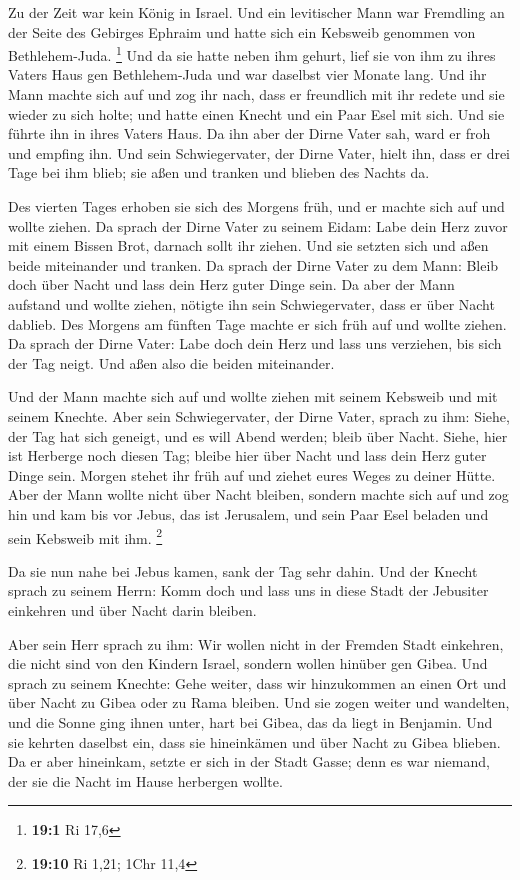  Zu der Zeit war kein König in Israel. Und ein levitischer
Mann war Fremdling an der Seite des Gebirges Ephraim und hatte sich ein
Kebsweib genommen von Bethlehem-Juda. \footnote{\textbf{19:1} Ri 17,6}
 Und da sie hatte neben ihm gehurt, lief sie von ihm zu
ihres Vaters Haus gen Bethlehem-Juda und war daselbst vier Monate lang.
 Und ihr Mann machte sich auf und zog ihr nach, dass er
freundlich mit ihr redete und sie wieder zu sich holte; und hatte einen
Knecht und ein Paar Esel mit sich. Und sie führte ihn in ihres Vaters
Haus. Da ihn aber der Dirne Vater sah, ward er froh und empfing ihn.
 Und sein Schwiegervater, der Dirne Vater, hielt ihn, dass
er drei Tage bei ihm blieb; sie aßen und tranken und blieben des Nachts
da.

 Des vierten Tages erhoben sie sich des Morgens früh, und
er machte sich auf und wollte ziehen. Da sprach der Dirne Vater zu
seinem Eidam: Labe dein Herz zuvor mit einem Bissen Brot, darnach sollt
ihr ziehen.  Und sie setzten sich und aßen beide
miteinander und tranken. Da sprach der Dirne Vater zu dem Mann: Bleib
doch über Nacht und lass dein Herz guter Dinge sein.  Da
aber der Mann aufstand und wollte ziehen, nötigte ihn sein
Schwiegervater, dass er über Nacht dablieb.  Des Morgens
am fünften Tage machte er sich früh auf und wollte ziehen. Da sprach der
Dirne Vater: Labe doch dein Herz und lass uns verziehen, bis sich der
Tag neigt. Und aßen also die beiden miteinander.

 Und der Mann machte sich auf und wollte ziehen mit seinem
Kebsweib und mit seinem Knechte. Aber sein Schwiegervater, der Dirne
Vater, sprach zu ihm: Siehe, der Tag hat sich geneigt, und es will Abend
werden; bleib über Nacht. Siehe, hier ist Herberge noch diesen Tag;
bleibe hier über Nacht und lass dein Herz guter Dinge sein. Morgen
stehet ihr früh auf und ziehet eures Weges zu deiner Hütte.
 Aber der Mann wollte nicht über Nacht bleiben, sondern
machte sich auf und zog hin und kam bis vor Jebus, das ist Jerusalem,
und sein Paar Esel beladen und sein Kebsweib mit ihm. \footnote{\textbf{19:10}
  Ri 1,21; 1Chr 11,4}

 Da sie nun nahe bei Jebus kamen, sank der Tag sehr
dahin. Und der Knecht sprach zu seinem Herrn: Komm doch und lass uns in
diese Stadt der Jebusiter einkehren und über Nacht darin bleiben.

 Aber sein Herr sprach zu ihm: Wir wollen nicht in der
Fremden Stadt einkehren, die nicht sind von den Kindern Israel, sondern
wollen hinüber gen Gibea.  Und sprach zu seinem Knechte:
Gehe weiter, dass wir hinzukommen an einen Ort und über Nacht zu Gibea
oder zu Rama bleiben.  Und sie zogen weiter und
wandelten, und die Sonne ging ihnen unter, hart bei Gibea, das da liegt
in Benjamin.  Und sie kehrten daselbst ein, dass sie
hineinkämen und über Nacht zu Gibea blieben. Da er aber hineinkam,
setzte er sich in der Stadt Gasse; denn es war niemand, der sie die
Nacht im Hause herbergen wollte.

